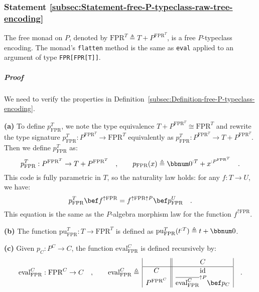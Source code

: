 \subsubsection{Statement \label{subsec:Statement-free-P-typeclass-raw-tree-encoding}\ref{subsec:Statement-free-P-typeclass-raw-tree-encoding}}

The free monad on $P$, denoted by $\text{FPR}^{T}\triangleq T+P^{\text{FPR}^{T}}$,
is a free $P$-typeclass encoding. The monad\textsf{'}s \lstinline!flatten!
method is the same as \lstinline!eval!
applied to an argument of type \lstinline!FPR[FPR[T]]!.

\subparagraph{Proof}

We need to verify the properties in Definition~\ref{subsec:Definition-free-P-typeclass-encoding}.

\textbf{(a)} To define $p_{\text{FPR}}^{T}$, we note the type equivalence
$T+P^{\text{FPR}^{T}}\cong\text{FPR}^{T}$ and rewrite the type signature
$p_{\text{FPR}}^{T}:P^{\text{FPR}^{T}}\rightarrow\text{FPR}^{T}$
equivalently as $p_{\text{FPR}}^{T}:P^{\text{FPR}^{T}}\rightarrow T+P^{\text{FPR}^{T}}$.
Then we define $p_{\text{FPR}}^{T}$ as:
\[
p_{\text{FPR}}^{T}:P^{\text{FPR}^{T}}\rightarrow T+P^{\text{FPR}^{T}}\quad,\quad\quad p_{\text{FPR}}(x)\triangleq\bbnum 0^{:T}+x^{:P^{\text{FPR}^{T}}}\quad.
\]
This code is fully parametric in $T$, so the naturality law holds:
for any $f:T\rightarrow U$, we have:
\[
p_{\text{FPR}}^{T}\bef f^{\uparrow\text{FPR}}=f^{\uparrow\text{FPR}\uparrow P}\bef p_{\text{FPR}}^{U}\quad.
\]
This equation is the same as the $P$-algebra morphism law for the
function $f^{\uparrow\text{FPR}}$.

\textbf{(b)} The function $\text{pu}_{\text{FPR}}^{T}:T\rightarrow\text{FPR}^{T}$
is defined as $\text{pu}_{\text{FPR}}^{T}(t^{:T})\triangleq t+\bbnum 0$.

\textbf{(c)} Given $p_{C}:P^{C}\rightarrow C$, the function $\text{eval}_{\text{FPR}}^{C}$
is defined recursively by:
\[
\text{eval}_{\text{FPR}}^{C}:\text{FPR}^{C}\rightarrow C\quad,\quad\quad\text{eval}_{\text{FPR}}^{C}\triangleq\,\begin{array}{|c||c|}
 & C\\
\hline C & \text{id}\\
P^{\text{FPR}^{C}} & \overline{\text{eval}_{\text{FPR}}^{C}}^{\uparrow P}\bef p_{C}
\end{array}\quad.
\]

